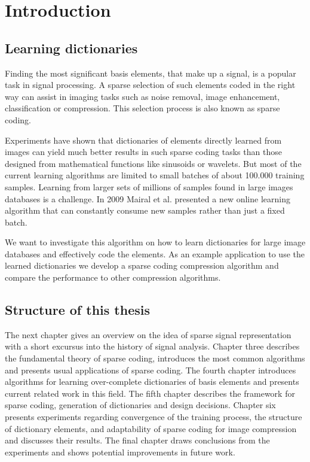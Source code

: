 \chapter{Introduction}
\label{sec:introduction}
\section{Learning dictionaries}

Finding the most significant basis elements, that make up a
signal, is a popular task in signal processing. A sparse selection of such
elements coded in the right way can assist in imaging tasks such as noise
removal, image enhancement, classification or compression. This selection
process is also known as sparse coding.

Experiments \cite{Chen1998,Elad2006} have shown that dictionaries of 
elements directly learned from images can yield much better results in
such sparse coding tasks than those designed from mathematical functions like
sinusoids or wavelets. But most of the current learning algorithms are limited
to small batches of about 100.000 training samples. Learning from
larger sets of millions of samples found in large images databases is a
challenge. In 2009 Mairal et al.\cite{Mairal2009} presented a new online
learning algorithm that can constantly consume new samples rather than just a
fixed batch. 

We want to investigate this algorithm on how to learn dictionaries
for large image databases and effectively code the elements. As an example
application to use the learned dictionaries we develop a sparse coding
compression algorithm and compare the performance to other compression
algorithms.

\section{Structure of this thesis}
The next chapter gives an overview on the idea of sparse signal
representation with a short excursus into the history of signal analysis.
Chapter three describes the fundamental theory of sparse coding, introduces the
most common algorithms and presents usual applications of sparse coding. The
fourth chapter introduces algorithms for learning over-complete
dictionaries of basis elements and presents current related work in this field.
The fifth chapter describes the framework for sparse coding, generation
of dictionaries and design decisions. Chapter six presents experiments regarding
convergence of the training process, the structure of dictionary elements, and
adaptability of sparse coding for image compression and discusses their results.
The final chapter draws conclusions from the experiments and shows potential
improvements in future work. 


